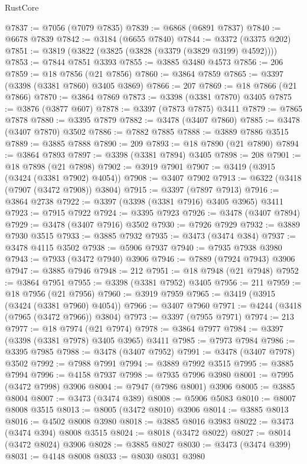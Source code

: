 \begin{lexlean}{RustCore}
\begin{coremodule}
@7837 := @7056 (@7079 @7835)
@7839 := @6868 (@6891 @7837)
@7840 := @6678 @7839
@7842 := @3184 (@6655 @7840)
@7844 := @3372 (@3375 @202)
@7851 := @3819 (@3822 (@3825 (@3828 (@3379 (@3829 @3199) @4592))))
@7853 := @7844 @7851 @3393
@7855 := @3885 @3480 @4573
@7856 := 206
@7859 := @18 @7856 (@21 @7856)
@7860 := @3864 @7859
@7865 := @3397 (@3398 (@3381 @7860) @3405 @3869)
@7866 := 207
@7869 := @18 @7866 (@21 @7866)
@7870 := @3864 @7869
@7873 := @3398 (@3381 @7870) @3405
@7875 := @3876 (@3877 @607)
@7878 := @3397 (@7873 @7875) @3411
@7879 := @7865 @7878
@7880 := @3395 @7879
@7882 := @3478 (@3407 @7860)
@7885 := @3478 (@3407 @7870) @3502
@7886 := @7882 @7885
@7888 := @3889 @7886 @3515
@7889 := @3885 @7888
@7890 := 209
@7893 := @18 @7890 (@21 @7890)
@7894 := @3864 @7893
@7897 := @3398 (@3381 @7894) @3405
@7898 := 208
@7901 := @18 @7898 (@21 @7898)
@7902 := @3919 @7901
@7907 := @3419 (@3915 (@3424 (@3381 @7902) @4054))
@7908 := @3407 @7902
@7913 := @6322 (@3418 (@7907 (@3472 @7908)) @3804)
@7915 := @3397 (@7897 @7913)
@7916 := @3864 @2738
@7922 := @3397 (@3398 (@3381 @7916) @3405 @3965) @3411
@7923 := @7915 @7922
@7924 := @3395 @7923
@7926 := @3478 (@3407 @7894)
@7929 := @3478 (@3407 @7916) @3502
@7930 := @7926 @7929
@7932 := @3889 @7930 @3515
@7933 := @3885 @7932
@7935 := @3473 (@3474 @384)
@7937 := @3478 @4115 @3502
@7938 := @5906 @7937
@7940 := @7935 @7938 @3980
@7943 := @7933 (@3472 @7940) @3906
@7946 := @7889 (@7924 @7943) @3906
@7947 := @3885 @7946
@7948 := 212
@7951 := @18 @7948 (@21 @7948)
@7952 := @3864 @7951
@7955 := @3398 (@3381 @7952) @3405
@7956 := 211
@7959 := @18 @7956 (@21 @7956)
@7960 := @3919 @7959
@7965 := @3419 (@3915 (@3424 (@3381 @7960) @4054))
@7966 := @3407 @7960
@7971 := @4244 (@3418 (@7965 (@3472 @7966)) @3804)
@7973 := @3397 (@7955 @7971)
@7974 := 213
@7977 := @18 @7974 (@21 @7974)
@7978 := @3864 @7977
@7984 := @3397 (@3398 (@3381 @7978) @3405 @3965) @3411
@7985 := @7973 @7984
@7986 := @3395 @7985
@7988 := @3478 (@3407 @7952)
@7991 := @3478 (@3407 @7978) @3502
@7992 := @7988 @7991
@7994 := @3889 @7992 @3515
@7995 := @3885 @7994
@7996 := @4158 @7937
@7998 := @7935 @7996 @3980
@8001 := @7995 (@3472 @7998) @3906
@8004 := @7947 (@7986 @8001) @3906
@8005 := @3885 @8004
@8007 := @3473 (@3474 @389)
@8008 := @5906 @5083
@8010 := @8007 @8008 @3515
@8013 := @8005 (@3472 @8010) @3906
@8014 := @3885 @8013
@8016 := @4502 @8008 @3980
@8018 := @3885 @8016 @3983
@8022 := @3473 (@3474 @394) @8008 @3515
@8024 := @8018 (@3472 @8022)
@8027 := @8014 (@3472 @8024) @3906
@8028 := @3885 @8027
@8030 := @3473 (@3474 @399)
@8031 := @4148 @8008
@8033 := @8030 @8031 @3980

\end{coremodule}
\end{lexlean}
